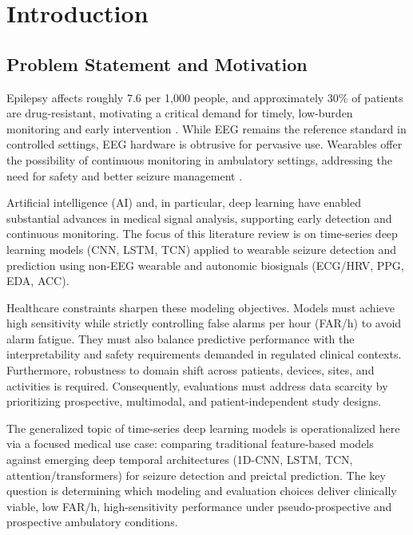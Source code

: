 \section{Introduction}

\subsection{Problem Statement and Motivation}
Epilepsy affects roughly 7.6 per 1,000 people, and approximately 30\% of
patients are drug-resistant, motivating a critical demand for timely,
low-burden monitoring and early intervention \parencite{beghiEpidemiologyEpilepsy2019,
kwanEarlyIdentificationRefractory2000, chenNewEraPersonalised2020}.
While EEG remains the reference standard in controlled settings, EEG
hardware is obtrusive for pervasive use. Wearables offer the possibility
of continuous monitoring in ambulatory settings, addressing the need for
safety and better seizure management \parencite{chenNewEraPersonalised2020}.

Artificial intelligence (AI) and, in particular, deep learning have
enabled substantial advances in medical signal analysis, supporting
early detection and continuous monitoring. The focus of this literature
review is on time-series deep learning models (CNN, LSTM, TCN) applied
to wearable seizure detection and prediction using non-EEG wearable
and autonomic biosignals (ECG/HRV, PPG, EDA, ACC).

Healthcare constraints sharpen these modeling objectives. Models must
achieve high sensitivity while strictly controlling false alarms per
hour (FAR/h) to avoid alarm fatigue. They must also balance predictive
performance with the interpretability and safety requirements demanded
in regulated clinical contexts. Furthermore, robustness to domain shift
across patients, devices, sites, and activities is required.
Consequently, evaluations must address data scarcity by prioritizing
prospective, multimodal, and patient-independent study designs.

The generalized topic of time-series deep learning models is
operationalized here via a focused medical use case: comparing
traditional feature-based models against emerging deep temporal
architectures (1D-CNN, LSTM, TCN, attention/transformers) for seizure
detection and preictal prediction. The key question is determining
which modeling and evaluation choices deliver clinically viable, low
FAR/h, high-sensitivity performance under pseudo-prospective and
prospective ambulatory conditions.

